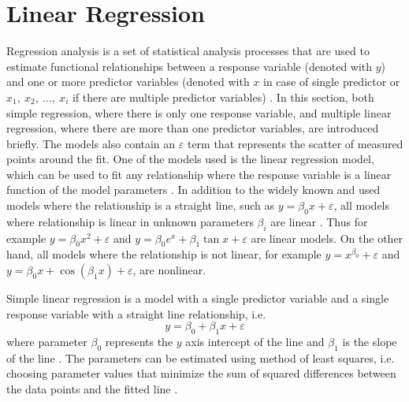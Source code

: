 \documentclass[english, twoside]{HYgradu}
\begin{document}
\section{Linear Regression} \label{sect:regression}
Regression analysis is a set of statistical analysis processes that are used to estimate functional relationships between a response variable (denoted with $y$) and one or more predictor variables (denoted with $x$ in case of single predictor or $x_1,\ x_2,\ \dots,\ x_i$ if there are multiple predictor variables) \citep{feigelson2012modern}. In this section, both simple regression, where there is only one response variable, and multiple linear regression, where there are more than one predictor variables, are introduced briefly. The models also contain an $\varepsilon$ term that represents the scatter of measured points around the fit. One of the models used is the linear regression model, which can be used to fit any relationship where the response variable is a linear function of the model parameters \citep{montgomery2012introduction}. In addition to the widely known and used models where the relationship is a straight line, such as $y = \beta_0 x + \varepsilon$, 
all models where relationship is linear in unknown parameters $\beta_i$ are linear \citep{montgomery2012introduction}. Thus for example $y = \beta_0 x^2 + \varepsilon$ and $y = \beta_0 e^x + \beta_1 \tan{x} + \varepsilon$ are linear models.
On the other hand, all models where the relationship is not linear, for example $y = x^{\beta_0} + \varepsilon$ and $y = \beta_0 x + \cos{(\beta_1 x)} + \varepsilon$,
are nonlinear.

Simple linear regression is a model with a single predictor variable and a single response variable with a straight line relationship, i.e.
\begin{equation}
	y = \beta_0 + \beta_1 x + \varepsilon
\end{equation}
where parameter $\beta_0$ represents the $y$ axis intercept of the line and $\beta_1$ is the slope of the line \citep{montgomery2012introduction}. The parameters can be estimated using method of least squares, i.e. choosing parameter values that minimize the sum of squared differences between the data points and the fitted line \citep{montgomery2012introduction}. 
\end{document}

